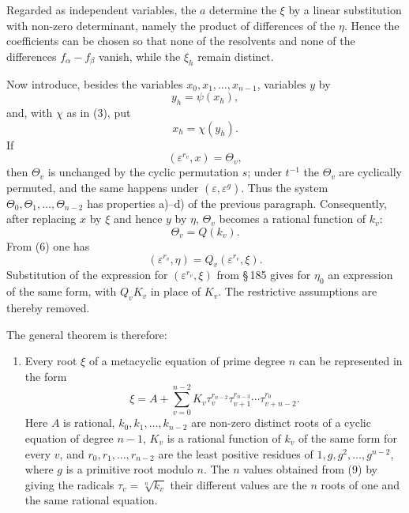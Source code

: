 \documentclass[11pt]{article}
\begin{document}
Regarded as independent variables, the $a$ determine the $\xi$ by a linear substitution with non-zero determinant, namely the product of differences of the $\eta$. Hence the coefficients can be chosen so that none of the resolvents and none of the differences $f_\alpha-f_\beta$ vanish, while the $\xi_h$ remain distinct.

Now introduce, besides the variables $x_0,x_1,\ldots,x_{n-1}$, variables $y$ by
\begin{equation}\tag{4}
  y_h=\psi(x_h),
\end{equation}
and, with $\chi$ as in (3), put
\begin{equation}\tag{5}
  x_h=\chi(y_h).
\end{equation}
If
\begin{equation}\tag{6}
  (\varepsilon^{r_v},x)=\Theta_v,
\end{equation}
then $\Theta_v$ is unchanged by the cyclic permutation $s$; under $t^{-1}$ the $\Theta_v$ are cyclically permuted, and the same happens under $(\varepsilon,\varepsilon^g)$. Thus the system $\Theta_0,\Theta_1,\ldots,\Theta_{n-2}$ has properties a)--d) of the previous paragraph. Consequently, after replacing $x$ by $\xi$ and hence $y$ by $\eta$, $\Theta_v$ becomes a rational function of $k_v$:
\begin{equation}\tag{7}
  \Theta_v=Q(k_v).
\end{equation}
From (6) one has
\begin{equation}\tag{8}
  (\varepsilon^{r_v},\eta)=Q_v(\varepsilon^{r_v},\xi).
\end{equation}
Substitution of the expression for $(\varepsilon^{r_v},\xi)$ from \S\,185 gives for $\eta_0$ an expression of the same form, with $Q_vK_v$ in place of $K_v$. The restrictive assumptions are thereby removed.

The general theorem is therefore:

\begin{enumerate}[label=\Roman*.]
\item Every root $\xi$ of a metacyclic equation of prime degree $n$ can be represented in the form
\begin{equation}\tag{9}
  \xi=A+
  \sum_{v=0}^{n-2}K_v\tau_v^{r_{n-2}}\tau_{v+1}^{r_{n-3}}\cdots\tau_{v+n-2}^{r_0}.
\end{equation}
Here $A$ is rational, $k_0,k_1,\ldots,k_{n-2}$ are non-zero distinct roots of a cyclic equation of degree $n-1$, $K_v$ is a rational function of $k_v$ of the same form for every $v$, and $r_0,r_1,\ldots,r_{n-2}$ are the least positive residues of $1,g,g^2,\ldots,g^{n-2}$, where $g$ is a primitive root modulo $n$. The $n$ values obtained from (9) by giving the radicals $\tau_v=\sqrt[n]{k_v}$ their different values are the $n$ roots of one and the same rational equation.
\end{enumerate}
\end{document}
